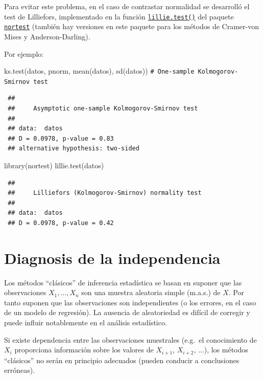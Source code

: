\documentclass[
  10pt,
]{book}
\newenvironment{Shaded}{\begin{snugshade}}{\end{snugshade}}
\newcommand{\CommentTok}[1]{\textcolor[rgb]{0.56,0.35,0.01}{\textit{#1}}}
\newcommand{\FunctionTok}[1]{\textcolor[rgb]{0.00,0.00,0.00}{#1}}
\newcommand{\NormalTok}[1]{#1}
\theoremstyle{break}
\theoremstyle{nonumberplain}
\renewcommand{\CommentTok}[1]{\textcolor[rgb]{0.41,0.41,0.41}{\texttt{#1}}}
\begin{document}
Para evitar este problema, en el caso de contrastar normalidad se desarrolló el test
de Lilliefors, implementado en la función \href{https://rdrr.io/pkg/nortest/man/lillie.test.html}{\texttt{lillie.test()}} del paquete \href{https://CRAN.R-project.org/package=nortest}{\texttt{nortest}}
(también hay versiones en este paquete para los métodos de Cramer-von Mises y
Anderson-Darling).

Por ejemplo:

\begin{Shaded}
\begin{Highlighting}[]
\FunctionTok{ks.test}\NormalTok{(datos, pnorm, }\FunctionTok{mean}\NormalTok{(datos), }\FunctionTok{sd}\NormalTok{(datos)) }\CommentTok{\# One{-}sample Kolmogorov{-}Smirnov test}
\end{Highlighting}
\end{Shaded}

\begin{verbatim}
 ## 
 ##     Asymptotic one-sample Kolmogorov-Smirnov test
 ## 
 ## data:  datos
 ## D = 0.0978, p-value = 0.83
 ## alternative hypothesis: two-sided
\end{verbatim}

\begin{Shaded}
\begin{Highlighting}[]
\FunctionTok{library}\NormalTok{(nortest)}
\FunctionTok{lillie.test}\NormalTok{(datos)}
\end{Highlighting}
\end{Shaded}

\begin{verbatim}
 ## 
 ##     Lilliefors (Kolmogorov-Smirnov) normality test
 ## 
 ## data:  datos
 ## D = 0.0978, p-value = 0.42
\end{verbatim}

\hypertarget{diag-aleat}{%
\section{Diagnosis de la independencia}\label{diag-aleat}}

Los métodos ``clásicos'' de inferencia estadística se basan en suponer que las observaciones \(X_{1},\ldots,X_{n}\) son una muestra aleatoria simple (m.a.s.) de \(X\).
Por tanto suponen que las observaciones son independientes (o los errores, en el caso de un modelo de regresión).
La ausencia de aleatoriedad es difícil de corregir y puede influir notablemente en el análisis estadístico.

Si existe dependencia entre las observaciones muestrales (e.g.~el conocimiento de \(X_{i}\) proporciona información sobre los valores de \(X_{i+1}\), \(X_{i+2}\), \(\ldots\)), los métodos ``clásicos'' no serán en principio adecuados (pueden conducir a conclusiones erróneas).
\end{document}
